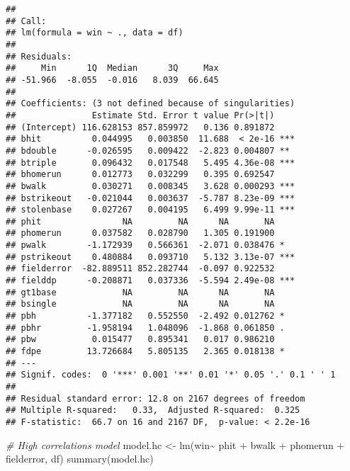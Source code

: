 \documentclass[
]{article}
\newenvironment{Shaded}{\begin{snugshade}}{\end{snugshade}}
\newcommand{\CommentTok}[1]{\textcolor[rgb]{0.56,0.35,0.01}{\textit{#1}}}
\newcommand{\FunctionTok}[1]{\textcolor[rgb]{0.00,0.00,0.00}{#1}}
\newcommand{\NormalTok}[1]{#1}
\newcommand{\OtherTok}[1]{\textcolor[rgb]{0.56,0.35,0.01}{#1}}
\newcommand{\SpecialCharTok}[1]{\textcolor[rgb]{0.00,0.00,0.00}{#1}}
\begin{document}
\begin{verbatim}
## 
## Call:
## lm(formula = win ~ ., data = df)
## 
## Residuals:
##     Min      1Q  Median      3Q     Max 
## -51.966  -8.055  -0.016   8.039  66.645 
## 
## Coefficients: (3 not defined because of singularities)
##               Estimate Std. Error t value Pr(>|t|)    
## (Intercept) 116.628153 857.859972   0.136 0.891872    
## bhit          0.044995   0.003850  11.688  < 2e-16 ***
## bdouble      -0.026595   0.009422  -2.823 0.004807 ** 
## btriple       0.096432   0.017548   5.495 4.36e-08 ***
## bhomerun      0.012773   0.032299   0.395 0.692547    
## bwalk         0.030271   0.008345   3.628 0.000293 ***
## bstrikeout   -0.021044   0.003637  -5.787 8.23e-09 ***
## stolenbase    0.027267   0.004195   6.499 9.99e-11 ***
## phit                NA         NA      NA       NA    
## phomerun      0.037582   0.028790   1.305 0.191900    
## pwalk        -1.172939   0.566361  -2.071 0.038476 *  
## pstrikeout    0.480884   0.093710   5.132 3.13e-07 ***
## fielderror  -82.889511 852.282744  -0.097 0.922532    
## fielddp      -0.208871   0.037336  -5.594 2.49e-08 ***
## gt1base             NA         NA      NA       NA    
## bsingle             NA         NA      NA       NA    
## pbh          -1.377182   0.552550  -2.492 0.012762 *  
## pbhr         -1.958194   1.048096  -1.868 0.061850 .  
## pbw           0.015477   0.895341   0.017 0.986210    
## fdpe         13.726684   5.805135   2.365 0.018138 *  
## ---
## Signif. codes:  0 '***' 0.001 '**' 0.01 '*' 0.05 '.' 0.1 ' ' 1
## 
## Residual standard error: 12.8 on 2167 degrees of freedom
## Multiple R-squared:   0.33,  Adjusted R-squared:  0.325 
## F-statistic:  66.7 on 16 and 2167 DF,  p-value: < 2.2e-16
\end{verbatim}

\begin{Shaded}
\begin{Highlighting}[]
\CommentTok{\# High correlations model}
\NormalTok{model.hc }\OtherTok{\textless{}{-}} \FunctionTok{lm}\NormalTok{(win}\SpecialCharTok{\textasciitilde{}}\NormalTok{ phit }\SpecialCharTok{+}\NormalTok{ bwalk }\SpecialCharTok{+}\NormalTok{ phomerun }\SpecialCharTok{+}\NormalTok{ fielderror, df)}
\FunctionTok{summary}\NormalTok{(model.hc)}
\end{Highlighting}
\end{Shaded}
\end{document}
